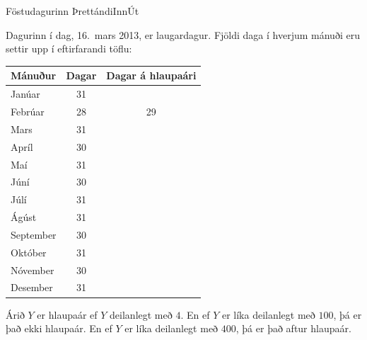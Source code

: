 \begin{problem}{Föstudagurinn Þrettándi}{Inn}{Út}{~}{~}
	\Examples

		\begin{example}
		\end{example}

	\Note

		Dagurinn í dag, 16.\ mars 2013, er laugardagur. Fjöldi daga í hverjum mánuði eru settir upp í eftirfarandi töflu:
		\begin{center}
			\begin{tabular}{lcc}
				\hline
				Mánuður & Dagar & Dagar á hlaupaári \\
				\hline
				Janúar & 31 &  \\
				Febrúar & 28 & 29 \\
				Mars & 31 &  \\
				Apríl & 30 &  \\
				Maí & 31 &  \\
				Júní & 30 &  \\
				Júlí & 31 &  \\
				Ágúst & 31 &  \\
				September & 30 &  \\
				Október & 31 &  \\
				Nóvember & 30 &  \\
				Desember & 31 &  \\
				\hline
			\end{tabular}
		\end{center}
		Árið $Y$ er hlaupaár ef $Y$ deilanlegt með $4$. En ef $Y$ er líka deilanlegt með $100$, þá er það ekki hlaupaár. En ef $Y$ er líka deilanlegt með $400$, þá er það aftur hlaupaár.

\end{problem}
